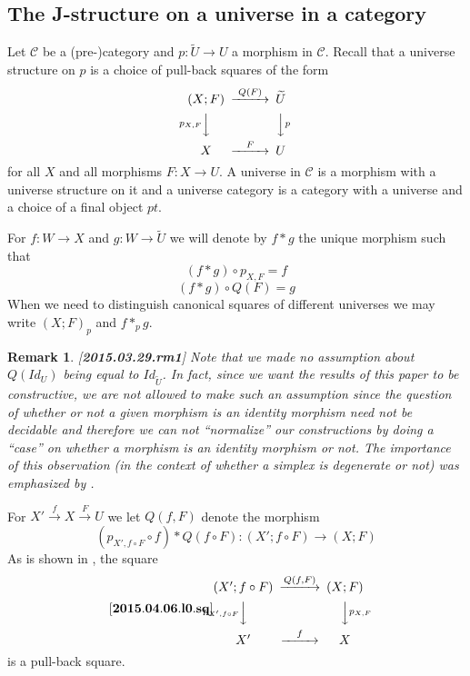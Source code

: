 \documentclass[12pt]{article}
\newenvironment{eq}{\begin{equation}}{\end{equation}}
\newtheorem{remark}[proposition]{Remark}
\newcommand{\llabel}[1]{\label{#1}[{\bf #1}]}
\newcommand{\sr}{\rightarrow}
\newcommand{\wt}{\widetilde}
\begin{document}
\subsection{The J-structure on a universe in a category}
%
Let $\mathcal C$ be a (pre-)category and $p:\wt{U}\sr U$ a morphism in $\mathcal C$. Recall that a universe structure on $p$ is a choice of pull-back squares of the form
%
$$
\begin{CD}
(X;F) @>Q(F)>> \wt{U}\\
@Vp_{X,F} VV @VV p V\\
X @>F>> U
\end{CD}
$$
%
for all $X$ and all morphisms $F:X\sr U$. A universe in $\mathcal C$ is a morphism with a universe structure on it and a universe category is a category with a universe and a choice of a final object $pt$.  

For $f:W\sr X$ and $g:W\sr \wt{U}$ we will denote by $f*g$ the unique morphism such that 
%
$$(f*g)\circ p_{X,F}=f$$
$$(f*g)\circ Q(F)=g$$
%
When we need to distinguish canonical squares of different universes we may write $(X;F)_{p}$ and $f*_p g$.
%
\begin{remark}\rm
\llabel{2015.03.29.rm1}
Note that we made no assumption about $Q(Id_U)$ being equal to $Id_{\wt{U}}$. In fact, since we want the results of this paper to be constructive, we are not allowed to make such an assumption since the question of whether or not a given morphism is an identity morphism need not be decidable and therefore we can not ``normalize'' our constructions by doing a ``case'' on whether a morphism is an identity morphism or not. The importance of this observation (in the context of whether a simplex is degenerate or not) was emphasized by \cite{BCH}.
\end{remark}
%
For $X'\stackrel{f}{\sr}X\stackrel{F}{\sr}U$ we let $Q(f,F)$ denote the morphism 
%
$$(p_{X',f\circ F}\circ f)*Q(f\circ F):(X';f\circ F)\sr (X;F)$$
%
As is shown in \cite{Cfromauniverse}, the square
%
\begin{eq}
\llabel{2015.04.06.l0.sq}
\begin{CD}
(X';f\circ F) @>Q(f,F)>> (X;F)\\
@Vp_{X',f\circ F} VV @VVp_{X,F}V\\
X' @>f>> X
\end{CD}
\end{eq}
%
is a pull-back square.
\end{document}
